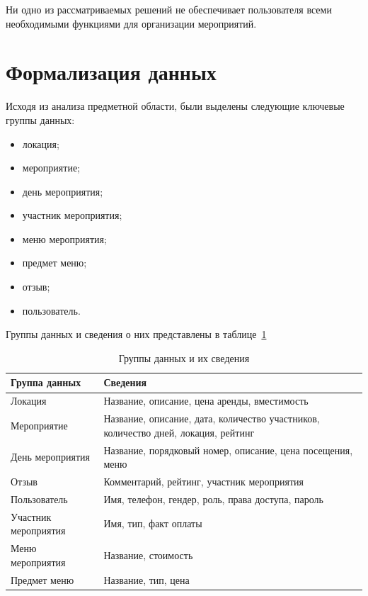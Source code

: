 Ни одно из рассматриваемых решений не обеспечивает пользователя всеми необходимыми функциями для организации мероприятий.

\section{Формализация данных}

Исходя из анализа предметной области, были выделены следующие ключевые группы данных:
\begin{itemize}[label=--]
	\item локация;
	\item мероприятие;
	\item день мероприятия;
	\item участник мероприятия;
	\item меню мероприятия;
	\item предмет меню;
	\item отзыв;
	\item пользователь.
\end{itemize}

Группы данных и сведения о них представлены в таблице~\ref{tbl:data-groups}

\begin{table}[h]
	\centering
	\caption{Группы данных и их сведения}
	\begin{tabularx}{\textwidth}{|X|X|}
		\hline
		\textbf{Группа данных} & \textbf{Сведения} \\
		\hline
		Локация & Название, описание, цена аренды, вместимость \\
		\hline
		Мероприятие & Название, описание, дата, количество участников, количество дней, локация, рейтинг \\
		\hline
		День мероприятия & Название, порядковый номер, описание, цена посещения, меню \\
		\hline
		Отзыв & Комментарий, рейтинг, участник мероприятия \\
		\hline
		Пользователь & Имя, телефон, гендер, роль, права доступа, пароль \\
		\hline
		Участник мероприятия & Имя, тип, факт оплаты \\
		\hline
		Меню мероприятия & Название, стоимость \\
		\hline
		Предмет меню & Название, тип, цена \\
		\hline
	\end{tabularx}
	\label{tbl:data-groups}
\end{table}


